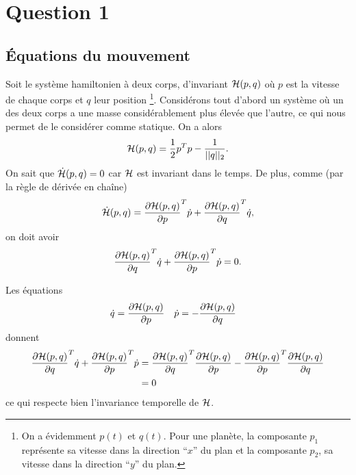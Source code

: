 \section{Question 1}
\subsection{Équations du mouvement}
Soit le système hamiltonien à deux corps, d'invariant $\mathcal{H} (p,q)$ où $p$ est la vitesse de chaque corps et $q$ leur position
\footnote{On a évidemment $p(t)$ et $q(t)$. Pour une planète, la composante $p_1$ représente sa vitesse dans la direction ``$x$'' du plan et la composante $p_2$, sa vitesse dans la direction ``$y$'' du plan.}.
Considérons tout d'abord un système où un des deux corps a une masse considérablement plus élevée que l'autre, ce qui nous permet de le considérer comme statique. On a alors
$$\mathcal{H} (p,q) = \frac{1}{2} p^T p - \frac{1}{||q||_2} . $$
On sait que $\dot{\mathcal{H}}(p,q) = 0$ car $\mathcal{H}$ est invariant dans le temps.
De plus, comme (par la règle de dérivée en chaîne)
\[
  \dot{\mathcal{H}}(p,q) = \frac{\partial \mathcal{H}(p,q)}{\partial p}^T\dot{p} + \frac{\partial \mathcal{H}(p,q)}{\partial q}^T\dot{q},
\]
on doit avoir
\[
  \frac{\partial \mathcal{H}(p,q)}{\partial q}^T\dot{q} + \frac{\partial \mathcal{H}(p,q)}{\partial p}^T\dot{p} = 0.
\]

Les équations
\begin{align*}
  \dot{q} & = \frac{\partial \mathcal{H}(p,q)}{\partial p} & \dot{p} & = -\frac{\partial \mathcal{H}(p,q)}{\partial q}
\end{align*}
donnent
\begin{align*}
  \frac{\partial \mathcal{H}(p,q)}{\partial q}^T\dot{q} + \frac{\partial \mathcal{H}(p,q)}{\partial p}^T\dot{p} & =
  \frac{\partial \mathcal{H}(p,q)}{\partial q}^T\frac{\partial \mathcal{H}(p,q)}{\partial p} - \frac{\partial \mathcal{H}(p,q)}{\partial p}^T\frac{\partial \mathcal{H}(p,q)}{\partial q}\\
  & = 0
\end{align*}
ce qui respecte bien l'invariance temporelle de $\mathcal{H}$.

